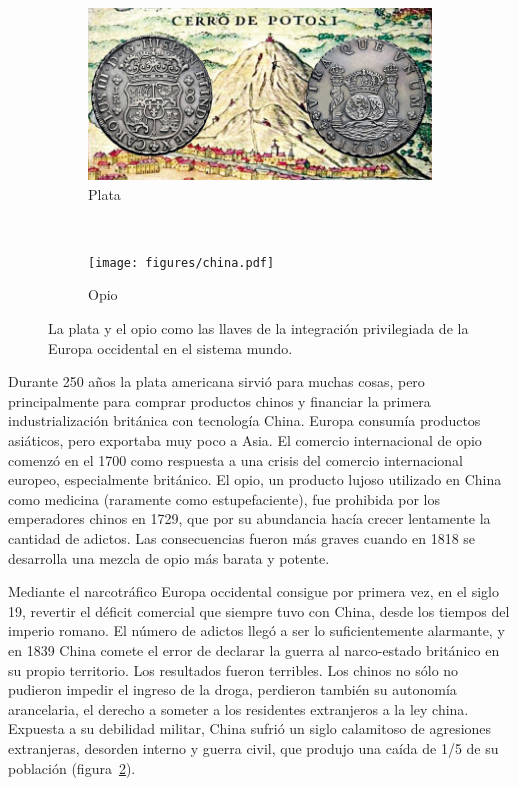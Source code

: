 \documentclass[a4paper,10pt]{book}
\begin{document}
\begin{figure}[ht!]     
  \centering 
  \begin{subfigure}[b]{0.48\textwidth}
    \includegraphics[width=\textwidth]{static/plata-potosi} 
    \caption{Plata}
    \label{fig:potosi}
  \end{subfigure}
   \ \ 
  \begin{subfigure}[b]{0.47\textwidth}
    \texttt{[image: figures/china.pdf]} 
   \caption{Opio}
    \label{fig:china-pop}
  \end{subfigure}
  \caption{La plata y el opio como las llaves de la integración privilegiada de la Europa occidental en el sistema mundo.}
  \label{fig:integracion}
\end{figure}

Durante 250 años la plata americana sirvió para muchas cosas, pero principalmente para comprar productos chinos y financiar la primera industrialización británica con tecnología China.
Europa consumía productos asiáticos, pero exportaba muy poco a Asia.
El comercio internacional de opio comenzó en el 1700 como respuesta a una crisis del comercio internacional europeo, especialmente británico.
El opio, un producto lujoso utilizado en China como medicina (raramente como estupefaciente), fue prohibida por los emperadores chinos en 1729, que por su abundancia hacía crecer lentamente la cantidad de adictos.
Las consecuencias fueron más graves cuando en 1818 se desarrolla una mezcla de opio más barata y potente.


Mediante el narcotráfico Europa occidental consigue por primera vez, en el siglo 19, revertir el déficit comercial que siempre tuvo con China, desde los tiempos del imperio romano.
El número de adictos llegó a ser lo suficientemente alarmante, y en 1839 China comete el error de declarar la guerra al narco-estado británico en su propio territorio.
Los resultados fueron terribles.
Los chinos no sólo no pudieron impedir el ingreso de la droga, perdieron también su autonomía arancelaria, el derecho a someter a los residentes extranjeros a la ley china.
Expuesta a su debilidad militar, China sufrió un siglo calamitoso de agresiones extranjeras, desorden interno y guerra civil, que produjo una caída de 1/5 de su población (figura~\ref{fig:china-pop}).
\end{document}
